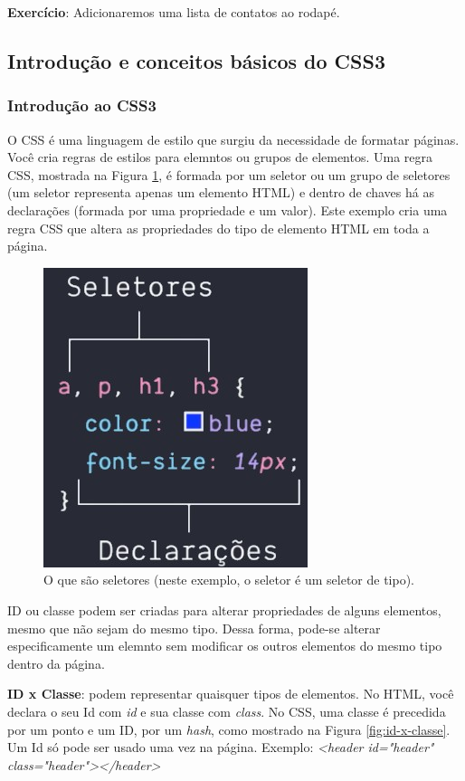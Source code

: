 \documentclass[12pt,a4paper]{article}
\begin{document}
	\textbf{Exercício}: Adicionaremos uma lista de contatos ao rodapé.
	
	\subsection{Introdução e conceitos básicos do CSS3}
	\subsubsection{Introdução ao CSS3}
	
	O CSS é uma linguagem de estilo que surgiu da necessidade de formatar páginas. Você cria regras de estilos para elemntos ou grupos de elementos. Uma regra CSS, mostrada na Figura \ref{fig:o-que-sao-seletores}, é formada por um seletor ou um grupo de seletores (um seletor representa apenas um elemento HTML) e dentro de chaves há as declarações (formada por uma propriedade e um valor). Este exemplo cria uma regra CSS que altera as propriedades do tipo de elemento HTML em toda a página.
	
	\begin{figure}[tbph!]
		\centering
		\includegraphics[width=0.3\linewidth]{images/o-que-sao-seletores}
		\caption{O que são seletores (neste exemplo, o seletor é um seletor de tipo).}
		\label{fig:o-que-sao-seletores}
	\end{figure}
	
	ID ou classe podem ser criadas para alterar propriedades de alguns elementos, mesmo que não sejam do mesmo tipo. Dessa forma, pode-se alterar especificamente um elemnto sem modificar os outros elementos do mesmo tipo dentro da página.
	
	\textbf{ID x Classe}: podem representar quaisquer tipos de elementos. No HTML, você declara o seu Id com \textit{id} e sua classe com \textit{class}. No CSS, uma classe é precedida por um ponto e um ID, por um \textit{hash}, como mostrado na Figura \ref{fig:id-x-classe}. Um Id só pode ser usado uma vez na página.
	Exemplo: \textit{<header id="header" class="header"></header>}
	
\end{document}
